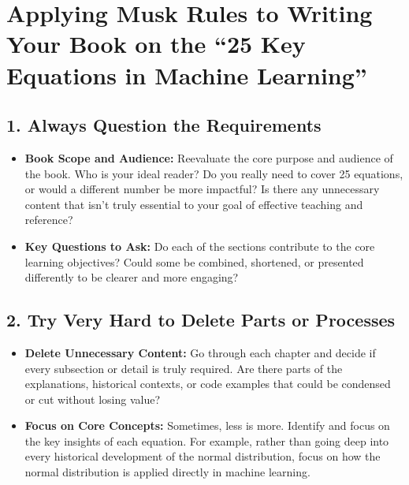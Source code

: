 \documentclass[
  12 pt,
  a4paper,
]{book}
\providecommand{\tightlist}{%
  \setlength{\itemsep}{0pt}\setlength{\parskip}{0pt}}
\numberwithin{equation}{section}
\theoremstyle{plain}      %
\theoremstyle{definition} %
\theoremstyle{remark}     %
\theoremstyle{note}         %
\begin{document}
\hypertarget{applying-musk-rules-to-writing-your-book-on-the-25-key-equations-in-machine-learning}{%
\section*{Applying Musk Rules to Writing Your Book on the ``25 Key
Equations in Machine
Learning''}\label{applying-musk-rules-to-writing-your-book-on-the-25-key-equations-in-machine-learning}}

\hypertarget{always-question-the-requirements}{%
\subsection*{\texorpdfstring{1. \textbf{Always Question the
Requirements}}{1. Always Question the Requirements}}\label{always-question-the-requirements}}

\begin{itemize}
\tightlist
\item
  \textbf{Book Scope and Audience:} Reevaluate the core purpose and
  audience of the book. Who is your ideal reader? Do you really need to
  cover 25 equations, or would a different number be more impactful? Is
  there any unnecessary content that isn't truly essential to your goal
  of effective teaching and reference?
\item
  \textbf{Key Questions to Ask:} Do each of the sections contribute to
  the core learning objectives? Could some be combined, shortened, or
  presented differently to be clearer and more engaging?
\end{itemize}

\hypertarget{try-very-hard-to-delete-parts-or-processes}{%
\subsection*{\texorpdfstring{2. \textbf{Try Very Hard to Delete Parts or
Processes}}{2. Try Very Hard to Delete Parts or Processes}}\label{try-very-hard-to-delete-parts-or-processes}}

\begin{itemize}
\tightlist
\item
  \textbf{Delete Unnecessary Content:} Go through each chapter and
  decide if every subsection or detail is truly required. Are there
  parts of the explanations, historical contexts, or code examples that
  could be condensed or cut without losing value?
\item
  \textbf{Focus on Core Concepts:} Sometimes, less is more. Identify and
  focus on the key insights of each equation. For example, rather than
  going deep into every historical development of the normal
  distribution, focus on how the normal distribution is applied directly
  in machine learning.
\end{itemize}
\end{document}
